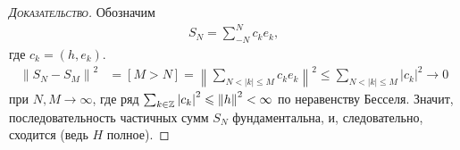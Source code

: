 \documentclass[../complex-analysis.tex]{subfiles}
\begin{document}
\begin{proof}[\normalfont\textsc{Доказательство}]
 Обозначим
 \begin{align*}
  S_N = \sum_{-N}^{N} c_ke_k,
 \end{align*} где $ c_k = (h,e_k) $.
 \begin{align*}
  \left\| S_N-S_M \right\|^{2} &= [M > N] = \left\|\sum_{N < \left| k \right| \leqslant M} c_k e_k \right\|^{2} \leqslant \sum_{N < \left| k \right| \leqslant M} \left| c_k \right|^{2} \to 0
 \end{align*} при $ N,M \to \infty $, где ряд $ \sum_{k \in \mathbb{Z}} \left| c_k \right|^{2} \leqslant \left\| h \right\|^{2}  <  \infty $ по неравенству Бесселя. Значит, последовательность частичных сумм $ S_N $  фундаментальна, и, следовательно, сходится (ведь $ H $ полное).
\end{proof}
\end{document}
